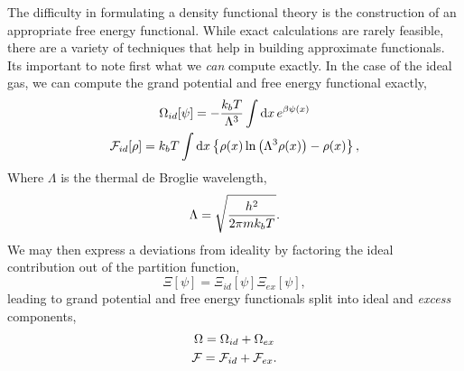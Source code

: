 The difficulty in formulating a density functional theory is the construction
of an appropriate free energy functional.  While exact calculations are rarely
feasible, there are a variety of techniques that help in building approximate
functionals.  Its important to note first what we \textit{can} compute exactly.
In the case of the ideal gas, we can compute the grand potential and free
energy functional exactly,
%
\begin{gather} \Omega_{id}[\psi] = -\frac{k_bT}{\Lambda^{3}} \int\mathrm{d}x\,
e^{\beta\psi(x)} \\ \mathcal{F}_{id}[\rho] = k_bT\int \mathrm{d}x\left\lbrace \rho(x)
\ln\left(\Lambda^3\rho(x)\right) - \rho(x) \right\rbrace, \end{gather}
% 
Where $\Lambda$ is the thermal de Broglie wavelength,
%
\begin{equation} \Lambda = \sqrt{\frac{h^2}{2\pi mk_bT}}.  \end{equation}
%
We may then express a deviations from ideality by factoring the ideal
contribution out of the partition function,
%
\begin{equation} \Xi[\psi] = \Xi_{id}[\psi]\Xi_{ex}[\psi], \end{equation}
%
leading to grand potential and free energy functionals split into ideal and
\textit{excess} components,
%
\begin{gather} \Omega = \Omega_{id} + \Omega_{ex} \\ \mathcal{F} = \mathcal{F}_{id} + \mathcal{F}_{ex}.
\end{gather}

